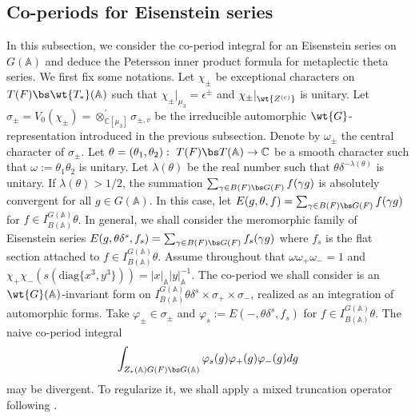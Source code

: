 \documentclass[11pt,reqno]{amsart}
\newcommand{\BA}{{\mathbb {A}}} \newcommand{\BB}{{\mathbb {B}}}
\newcommand{\BC}{{\mathbb {C}}} \newcommand{\BD}{{\mathbb {D}}}
\newcommand{\diag}{{\mathrm{diag}}}
\theoremstyle{plain}
\theoremstyle{remark} \newtheorem{remark}[thm]{Remark}
\theoremstyle{definition} \newtheorem{exercise}[thm]{Exercise}
\theoremstyle{definition} \newtheorem{example}[thm]{Example} \newtheorem{condition}[thm]{Condition}
\numberwithin{equation}{section}
\renewcommand{\-}{\text{--}}
\begin{document}
\subsection{Co-periods for Eisenstein series}
In this subsection, we consider the co-period integral for an Eisenstein series on $G(\BA)$ and deduce the Petersson inner product formula for metaplectic theta series.  We first fix some notations. Let $\chi_{\pm}$ be exceptional characters on $T(F)\bs \wt{T_*}(\BA)$ such that $\chi_{\pm}|_{\mu_3}=\epsilon^\pm$
and  $\chi_{\pm}|_{\wt{Z^{(c)}}}$ is unitary. Let $\sigma_{\pm}=V_0(\chi_\pm)=\otimes^\prime_{\BC[\mu_3]}\sigma_{\pm,v}$ be the irreducible automorphic $\wt{G}$-representation introduced in the previous subsection. Denote by $\omega_{\pm}$ the central character of $\sigma_{\pm}$. Let $\theta=(\theta_1,\theta_2):\ T(F)\bs T(\BA)\to\BC$ be a smooth character such that $\omega:=\theta_1\theta_2$ is unitary. Let $\lambda(\theta)$  be the real number such that $\theta\delta^{-\lambda(\theta)}$ is unitary. If $\lambda(\theta)>1/2$, the summation $\sum_{\gamma\in B(F)\bs G(F)}f(\gamma g)$ is absolutely convergent for all $g\in G(\BA)$. In this case, let $E(g,\theta,f)=\sum_{\gamma\in B(F)\bs G(F)}f(\gamma g)$ for $f\in I_{B(\BA)}^{G(\BA)}\theta$.  In general, we shall consider the meromorphic family of Eisenstein series $E(g,\theta\delta^s,f_s)=\sum_{\gamma\in B(F)\bs G(F)}f_s(\gamma g)$ where $f_s$ is the flat section attached to $f\in I_{B(\BA)}^{G(\BA)}\theta$.   Assume throughout  that $\omega\omega_+\omega_-=1$ and $\chi_+\chi_-(s(\diag\{x^3,y^3\}))=|x|_{\BA}|y|_{\BA}^{-1}$. The co-period we shall consider is an $\wt{G}(\BA)$-invariant   form on $I_{B(\BA)}^{G(\BA)}\theta\delta^s \times \sigma_+\times\sigma_-$, realized as an integration of automorphic forms. Take $\varphi_\pm\in \sigma_{\pm}$ and  $\varphi_s:=E(-,\theta\delta^s,f_s)$ for $f\in I_{B(\BA)}^{G(\BA)}\theta$. The naive  co-period integral 
\[\int_{Z_*(\BA)G(F)\bs G(\BA)}\varphi_s(g)\varphi_+(g)\varphi_-(g)dg\]
may be divergent. To regularize it, we shall apply a mixed truncation operator  following \cite{Yam18}. 
\end{document}
